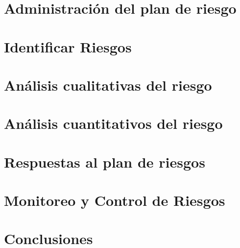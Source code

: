\documentclass[11pt,letterpaper]{article}
\begin{document}

\tableofcontents
\newpage

%

\section{Administración del plan de riesgo}

\section{Identificar Riesgos}

\section{Análisis cualitativas del riesgo}

\section{Análisis cuantitativos del riesgo}

\section{Respuestas al plan de riesgos}

\section{Monitoreo y Control de Riesgos}

\section{Conclusiones}

\end{document}
